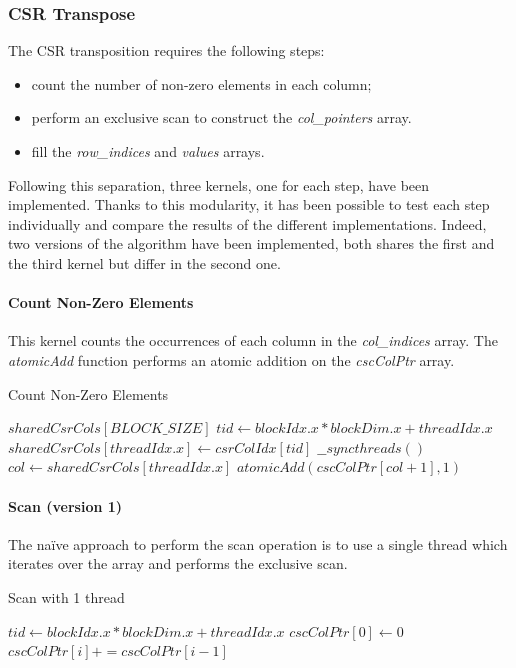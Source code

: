 \documentclass{IEEEconf}
\begin{document}
\subsubsection{CSR Transpose}
The CSR transposition requires the following steps:
\begin{itemize}
    \item count the number of non-zero elements in each column;
    \item perform an exclusive scan to construct the \textit{col\_pointers} array.
    \item fill the \textit{row\_indices}  and \textit{values} arrays.
\end{itemize}
Following this separation, three kernels, one for each step, have been implemented.
Thanks to this modularity, it has been possible to test each step individually and compare the results of the different implementations.
Indeed, two versions of the algorithm have been implemented, both shares the first and the third kernel but differ in the second one. \\
\paragraph{Count Non-Zero Elements}
This kernel counts the occurrences of each column in the \textit{col\_indices} array. 
The \textit{atomicAdd} function performs an atomic addition on the \textit{cscColPtr} array.
\begin{algorithm}
    \caption{Count Non-Zero Elements}
    \begin{algorithmic}
            \State $sharedCsrCols[BLOCK\_SIZE]$
            \State $tid \gets blockIdx.x * blockDim.x + threadIdx.x$
            \State $sharedCsrCols[threadIdx.x] \gets csrColIdx[tid]$
            \State $\_\_syncthreads()$
                \State $col \gets sharedCsrCols[threadIdx.x]$
                \State $atomicAdd(cscColPtr[col + 1], 1)$
            \EndIf
        \EndProcedure
    \end{algorithmic}
\end{algorithm}
\paragraph{Scan (version 1)}
The na\"ive approach to perform the scan operation is to use a single thread which iterates over the array and performs the exclusive scan.
\begin{algorithm}
    \caption{Scan with 1 thread}
    \begin{algorithmic}
            \State $tid \gets blockIdx.x * blockDim.x + threadIdx.x$
                \State $cscColPtr[0] \gets 0$
                    \State $cscColPtr[i] += cscColPtr[i - 1]$
                \EndFor
            \EndIf
        \EndProcedure
    \end{algorithmic}
\end{algorithm}
\end{document}

